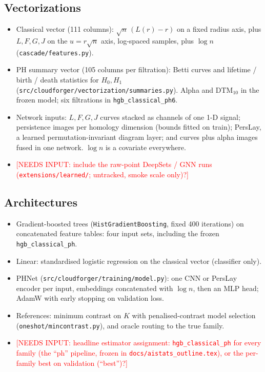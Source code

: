 \documentclass[twoside]{article}
\newcommand{\NI}[1]{\textcolor{red}{[NEEDS INPUT: #1]}}
\newcommand{\src}[1]{{\footnotesize\texttt{#1}}}
\begin{document}
\subsection{Vectorizations}
\begin{itemize}
  \item Classical vector (111 columns): $\sqrt n\,(L(r)-r)$ on a fixed radius axis, plus $L,F,G,J$ on the
        $u=r\sqrt n$ axis, log-spaced samples, plus $\log n$ (\src{cascade/features.py}).
  \item PH summary vector (105 columns per filtration): Betti curves and lifetime / birth / death statistics for
        $H_0,H_1$ (\src{src/cloudforger/vectorization/summaries.py}). Alpha and DTM$_{10}$ in the frozen model; six
        filtrations in \texttt{hgb\_classical\_ph6}.
  \item Network inputs: $L,F,G,J$ curves stacked as channels of one 1-D signal; persistence images per homology
        dimension (bounds fitted on train); PersLay, a learned permutation-invariant diagram layer; and curves plus
        alpha images fused in one network. $\log n$ is a covariate everywhere.
  \item \NI{include the raw-point DeepSets / GNN runs (\src{extensions/learned/}; untracked, smoke scale only)?}
\end{itemize}

\subsection{Architectures}
\begin{itemize}
  \item Gradient-boosted trees (\texttt{HistGradientBoosting}, fixed 400 iterations) on concatenated feature
        tables: four input sets, including the frozen \texttt{hgb\_classical\_ph}.
  \item Linear: standardised logistic regression on the classical vector (classifier only).
  \item PHNet (\src{src/cloudforger/training/model.py}): one CNN or PersLay encoder per input, embeddings
        concatenated with $\log n$, then an MLP head; AdamW with early stopping on validation loss.
  \item References: minimum contrast on $K$ with penalised-contrast model selection (\src{oneshot/mincontrast.py}),
        and oracle routing to the true family.
  \item \NI{headline estimator assignment: \texttt{hgb\_classical\_ph} for every family (the ``ph'' pipeline,
        frozen in \src{docs/aistats\_outline.tex}), or the per-family best on validation (``best'')?}
\end{itemize}
\end{document}
